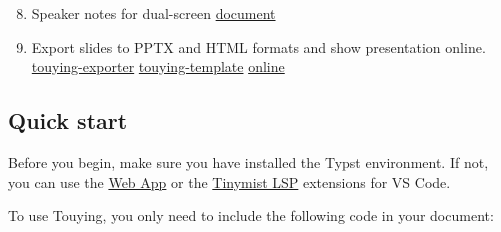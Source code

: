 \begin{enumerate}
\setcounter{enumi}{7}
\tightlist
\item
  Speaker notes for dual-screen
  \href{https://touying-typ.github.io/docs/external/pympress}{document}
\end{enumerate}


\begin{enumerate}
\setcounter{enumi}{8}
\tightlist
\item
  Export slides to PPTX and HTML formats and show presentation online.
  \href{https://github.com/touying-typ/touying-exporter}{touying-exporter}
  \href{https://github.com/touying-typ/touying-template}{touying-template}
  \href{https://touying-typ.github.io/touying-template/}{online}
\end{enumerate}


\subsection{Quick start}\label{quick-start}

Before you begin, make sure you have installed the Typst environment. If
not, you can use the \href{https://typst.app/}{Web App} or the
\href{https://marketplace.visualstudio.com/items?itemName=myriad-dreamin.tinymist}{Tinymist
LSP} extensions for VS Code.

To use Touying, you only need to include the following code in your
document:

\begin{Shaded}
\begin{Highlighting}[]






\end{Highlighting}
\end{Shaded}

